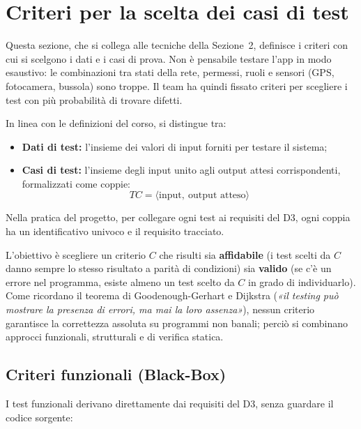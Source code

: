 \section{Criteri per la scelta dei casi di test}

Questa sezione, che si collega alle tecniche della Sezione~2, definisce i criteri con cui si scelgono i dati e i casi di prova. Non è pensabile testare l'app in modo esaustivo: le combinazioni tra stati della rete, permessi, ruoli e sensori (GPS, fotocamera, bussola) sono troppe. Il team ha quindi fissato criteri per scegliere i test con più probabilità di trovare difetti.

In linea con le definizioni del corso, si distingue tra:
\begin{itemize}
    \item \textbf{Dati di test:} l'insieme dei valori di input forniti per testare il sistema;
    \item \textbf{Casi di test:} l'insieme degli input unito agli output attesi corrispondenti, formalizzati come coppie:
    \[
    TC = \langle \text{input}, \: \text{output atteso} \rangle
    \]
\end{itemize}
Nella pratica del progetto, per collegare ogni test ai requisiti del D3, ogni coppia ha un identificativo univoco e il requisito tracciato.

L'obiettivo è scegliere un criterio $C$ che risulti sia \textbf{affidabile} (i test scelti da $C$ danno sempre lo stesso risultato a parità di condizioni) sia \textbf{valido} (se c'è un errore nel programma, esiste almeno un test scelto da $C$ in grado di individuarlo). Come ricordano il teorema di Goodenough-Gerhart e Dijkstra (\emph{«il testing può mostrare la presenza di errori, ma mai la loro assenza»}), nessun criterio garantisce la correttezza assoluta su programmi non banali; perciò si combinano approcci funzionali, strutturali e di verifica statica.

\subsection{Criteri funzionali (Black-Box)}
I test funzionali derivano direttamente dai requisiti del D3, senza guardare il codice sorgente:

